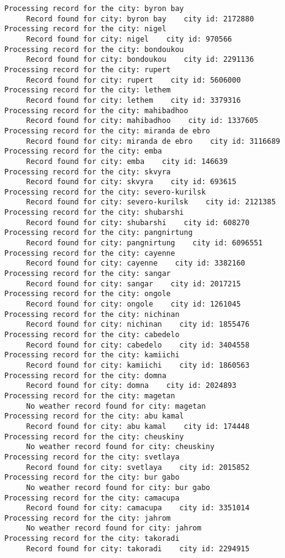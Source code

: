 \documentclass[11pt]{article}
\begin{document}
\begin{Verbatim}[commandchars=\\\{\}]
Processing record for the city: byron bay
     Record found for city: byron bay    city id: 2172880
Processing record for the city: nigel
     Record found for city: nigel    city id: 970566
Processing record for the city: bondoukou
     Record found for city: bondoukou    city id: 2291136
Processing record for the city: rupert
     Record found for city: rupert    city id: 5606000
Processing record for the city: lethem
     Record found for city: lethem    city id: 3379316
Processing record for the city: mahibadhoo
     Record found for city: mahibadhoo    city id: 1337605
Processing record for the city: miranda de ebro
     Record found for city: miranda de ebro    city id: 3116689
Processing record for the city: emba
     Record found for city: emba    city id: 146639
Processing record for the city: skvyra
     Record found for city: skvyra    city id: 693615
Processing record for the city: severo-kurilsk
     Record found for city: severo-kurilsk    city id: 2121385
Processing record for the city: shubarshi
     Record found for city: shubarshi    city id: 608270
Processing record for the city: pangnirtung
     Record found for city: pangnirtung    city id: 6096551
Processing record for the city: cayenne
     Record found for city: cayenne    city id: 3382160
Processing record for the city: sangar
     Record found for city: sangar    city id: 2017215
Processing record for the city: ongole
     Record found for city: ongole    city id: 1261045
Processing record for the city: nichinan
     Record found for city: nichinan    city id: 1855476
Processing record for the city: cabedelo
     Record found for city: cabedelo    city id: 3404558
Processing record for the city: kamiichi
     Record found for city: kamiichi    city id: 1860563
Processing record for the city: domna
     Record found for city: domna    city id: 2024893
Processing record for the city: magetan
     No weather record found for city: magetan
Processing record for the city: abu kamal
     Record found for city: abu kamal    city id: 174448
Processing record for the city: cheuskiny
     No weather record found for city: cheuskiny
Processing record for the city: svetlaya
     Record found for city: svetlaya    city id: 2015852
Processing record for the city: bur gabo
     No weather record found for city: bur gabo
Processing record for the city: camacupa
     Record found for city: camacupa    city id: 3351014
Processing record for the city: jahrom
     No weather record found for city: jahrom
Processing record for the city: takoradi
     Record found for city: takoradi    city id: 2294915

\end{Verbatim}
\end{document}
